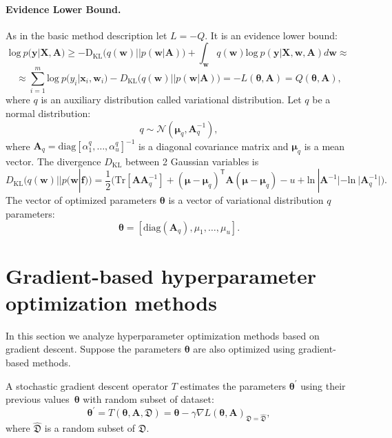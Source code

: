 \documentclass[smallcondensed]{svjour3}
\begin{document}
\paragraph{Evidence Lower Bound.}
As in the basic method description let $L=-Q$. It is an evidence lower bound:
\begin{equation} 
\label{eq:elbo}
\text{log}~p(\mathbf{y}|\mathbf{X},\mathbf{A})  
\geq 
-\text{D}_\text{KL} \bigl(q(\mathbf{w})||p(\mathbf{w}|\mathbf{A})\bigr) + \int_{\mathbf{w}} q(\mathbf{w})\text{log}~{p(\mathbf{y}|\mathbf{X},\mathbf{w},\mathbf{A})} d \mathbf{w}  \approx
\end{equation}
\[
\approx \sum_{i=1}^m \text{log}~p({y}_i|\mathbf{x}_i, \mathbf{w}_i) - D_\text{KL}\bigl(q (\mathbf{w}) || p (\mathbf{w}|\mathbf{A})\bigr) = -L(\boldsymbol{\theta}, \mathbf{A}) = Q(\boldsymbol{\theta}, \mathbf{A}),
\]
where $q$ is an auxiliary distribution called variational distribution. Let $q$ be a normal distribution:
\begin{equation}
\label{eq:diag}
	q \sim \mathcal{N}(\boldsymbol{\mu}_q, \mathbf{A}^{-1}_q),
\end{equation}
where $\mathbf{A}_q = \text{diag}[\alpha^q_1, \dots, \alpha^q_u]^{-1}$ is  a diagonal covariance matrix and $\boldsymbol{\mu}_q$ is a mean vector.
The divergence $D_\text{KL}$ between 2 Gaussian variables is 
\[
	D_\text{KL}\bigl(q (\mathbf{w}) || p (\mathbf{w}|\mathbf{f})\bigr) = \frac{1}{2} \bigl( \text{Tr} [\mathbf{A}\mathbf{A}^{-1}_q] + (\boldsymbol{\mu} - \boldsymbol{\mu}_q)^\mathsf{T}\mathbf{A}(\boldsymbol{\mu} - \boldsymbol{\mu}_q) - u +\text{ln}~|\mathbf{A}^{-1}| - \text{ln}~|\mathbf{A}_q^{-1}| \bigr).
\]
The vector of optimized parameters $\boldsymbol{\theta}$ is a vector of variational distribution $q$ parameters:
\[
\boldsymbol{\theta} = [\text{diag}(\mathbf{A}_q), {\mu}_1,\dots,{\mu}_u].
\]




\section{Gradient-based hyperparameter optimization methods}
\label{gbhom}
In this section we analyze hyperparameter optimization methods based on gradient descent. Suppose the parameters $\boldsymbol{\theta}$ are also optimized using gradient-based methods. 

\begin{definition}
A stochastic gradient descent operator $T$ estimates the parameters $\boldsymbol{\theta}^\prime$ using their previous values~$\boldsymbol{\theta}$ with random subset of dataset:
\[
	\boldsymbol{\theta}^\prime = T(\boldsymbol{\theta}, \mathbf{A}, \mathfrak{D}) = \boldsymbol{\theta} - \gamma \nabla L(\boldsymbol{\theta}, \mathbf{A})_{\mathfrak{D} = \hat{\mathfrak{D}}},
\]
where $\hat{\mathfrak{D}}$ is a random subset of $\mathfrak{D}$.
\end{definition}
\end{document}
